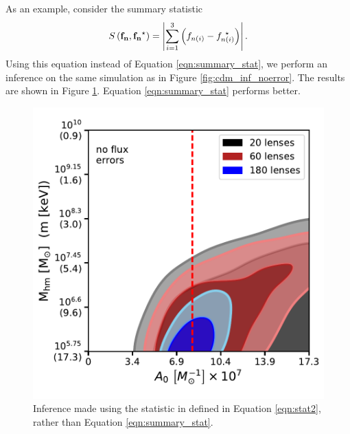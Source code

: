 As an example, consider the summary statistic
\begin{equation}
\label{eqn:stat2}
S \left({\bf{f_n}},{\bf{f_n}^{\star}} \right) = \left| \sum_{i=1}^{3} \left({f_{n\left(i\right)}} - {f_{n\left(i\right)}^{\ \star}}\right) \right| .
\end{equation} 
Using this equation instead of Equation \ref{eqn:summary_stat}, we perform an inference on the same simulation as in Figure \ref{fig:cdm_inf_noerror}. The results are shown in Figure \ref{fig:other_stat}. Equation \ref{eqn:summary_stat} performs better. 

\begin{figure}
	\centering
	\includegraphics[clip,trim=.15cm .5cm 0cm
	0cm,width=.45\textwidth,keepaspectratio]{./figures_ABCforward/joint_varynlens_noerrors_otherstat.pdf}
	\caption{\label{fig:other_stat} Inference made using the statistic in defined in Equation \ref{eqn:stat2}, rather than Equation \ref{eqn:summary_stat}.}
\end{figure} 


